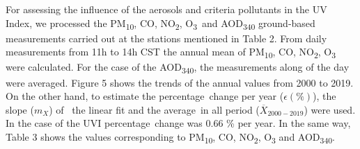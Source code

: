 \documentclass{article}
\begin{document}
For assessing the influence of the aerosols and criteria pollutants in
the UV Index, we processed the PM\textsubscript{10}, CO,
NO\textsubscript{2}, O\textsubscript{3}~and AOD\textsubscript{340}
ground-based measurements carried out at the stations mentioned in Table
2. From daily measurements from 11h to 14h CST the annual mean of
PM\textsubscript{10}, CO, NO\textsubscript{2}, O\textsubscript{3} were
calculated. For the case of the AOD\textsubscript{340}, the measurements
along of the day were averaged. Figure 5 %
shows the trends of the annual values from 2000 to 2019. On the other
hand, to estimate the percentage~change per year (\(\epsilon\left(\%\right)\)),
the slope (\(m_ {X}\)) of~ the linear fit and the average~in all
period (\(\overline{X}_{2000-2019}\)) were used. In the case of the UVI
percentage~change was 0.66 \% per year. In the same way, Table 3 shows
the values corresponding to PM\textsubscript{10}, CO,
NO\textsubscript{2}, O\textsubscript{3} and AOD\textsubscript{340}.~
\end{document}
